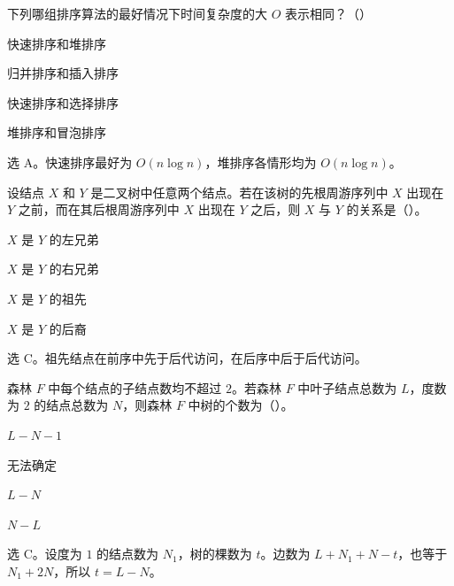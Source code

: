 \begin{question}
下列哪组排序算法的最好情况下时间复杂度的大 $O$ 表示相同？（\quad）
\begin{choiceoptions}[2]
  \item 快速排序和堆排序
  \item 归并排序和插入排序
  \item 快速排序和选择排序
  \item 堆排序和冒泡排序
\end{choiceoptions}
\begin{solution}
选 A。快速排序最好为 $O(n\log n)$，堆排序各情形均为 $O(n\log n)$。
\end{solution}
\end{question}

\begin{question}
设结点 $X$ 和 $Y$ 是二叉树中任意两个结点。若在该树的先根周游序列中 $X$ 出现在 $Y$ 之前，而在其后根周游序列中 $X$ 出现在 $Y$ 之后，则 $X$ 与 $Y$ 的关系是（\quad）。
\begin{choiceoptions}[1]
  \item $X$ 是 $Y$ 的左兄弟
  \item $X$ 是 $Y$ 的右兄弟
  \item $X$ 是 $Y$ 的祖先
  \item $X$ 是 $Y$ 的后裔
\end{choiceoptions}
\begin{solution}
选 C。祖先结点在前序中先于后代访问，在后序中后于后代访问。
\end{solution}
\end{question}

\begin{question}
森林 $F$ 中每个结点的子结点数均不超过 $2$。若森林 $F$ 中叶子结点总数为 $L$，度数为 $2$ 的结点总数为 $N$，则森林 $F$ 中树的个数为（\quad）。
\begin{choiceoptions}[1]
  \item $L-N-1$
  \item 无法确定
  \item $L-N$
  \item $N-L$
\end{choiceoptions}
\begin{solution}
选 C。设度为 $1$ 的结点数为 $N_1$，树的棵数为 $t$。边数为 $L+N_1+N-t$，也等于 $N_1+2N$，所以 $t=L-N$。
\end{solution}
\end{question}

